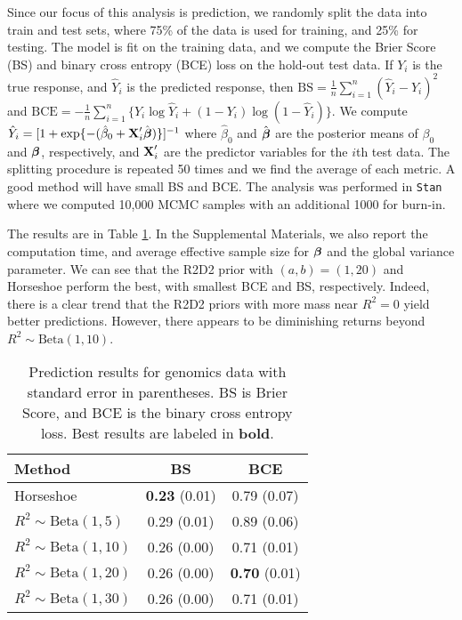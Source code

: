 \documentclass[12pt]{article}
\begin{document}
Since our focus of this analysis is prediction, we randomly split the data into train and test sets, where 75\% of the data is used for training, and 25\% for testing. The model is fit on the training data, and we compute the Brier Score (BS) and binary cross entropy (BCE) loss on the hold-out test data. If $Y_i$ is the true response, and $\hat Y_i$ is the predicted response, then
$
    \mbox{BS}=\frac1n\sum_{i=1}^n (\hat Y_i-Y_i)^2
$
and
$
    \mbox{BCE}=-\frac1n\sum_{i=1}^n \{Y_i\log\hat Y_i+(1-Y_i)\log(1-\hat Y_i)\}.
$
We compute $\hat Y_i=[1+\exp\{-(\hat\beta_0+\mbox{\bf X}'_i\hat{\mbox{\boldmath $\beta$}})\}]^{-1}$ where $\hat\beta_0$ and $\hat{\mbox{\boldmath $\beta$}}$ are the posterior means of $\beta_0$ and $\mbox{\boldmath $\beta$}$, respectively, and $\mbox{\bf X}_i'$ are the predictor variables for the $i$th test data. The splitting procedure is repeated 50 times and we find the average of each metric. A good method will have small BS and BCE. The analysis was performed in \texttt{Stan} where we computed 10,000 MCMC samples with an additional 1000 for burn-in.

The results are in Table \ref{tab:genom}. In the Supplemental Materials, we also report the computation time, and average effective sample size for $\mbox{\boldmath $\beta$}$ and the global variance parameter. We can see that the R2D2 prior with $(a,b)=(1,20)$ and Horseshoe perform the best, with smallest BCE and BS, respectively. Indeed, there is a clear trend that the R2D2 priors with more mass near $R^2=0$ yield better predictions. However, there appears to be diminishing returns beyond $R^2\sim\mbox{Beta}(1,10)$.

\begin{table}[]
    \centering
    \begin{tabular}{l|cc}
        Method & BS & BCE \\\hline
        Horseshoe & {\bf 0.23} (0.01) & 0.79 (0.07)\\
        $R^2\sim\mbox{Beta}(1,5)$ & 0.29 (0.01) & 0.89 (0.06) \\
        $R^2\sim\mbox{Beta}(1,10)$& 0.26 (0.00) & 0.71 (0.01) \\
        $R^2\sim\mbox{Beta}(1,20)$& 0.26 (0.00) & {\bf 0.70} (0.01)\\
        $R^2\sim\mbox{Beta}(1,30)$& 0.26 (0.00) & 0.71 (0.01)
    \end{tabular}
    \caption{Prediction results for genomics data with standard error in parentheses. BS is Brier Score, and BCE is the binary cross entropy loss. Best results are labeled in {\bf bold}. }
    \label{tab:genom}
\end{table}
\end{document}
